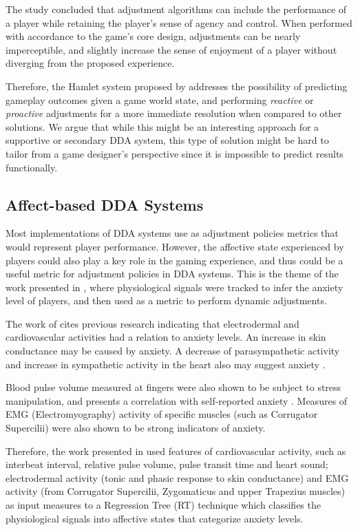 The study concluded that adjustment algorithms can include the performance of a player while retaining the player's sense of agency and control. When performed with accordance to the game's core design, adjustments can be nearly imperceptible, and slightly increase the sense of enjoyment of a player without diverging from the proposed experience.

Therefore, the Hamlet system proposed by \citet{article_casefordynamicdifficulty} addresses the possibility of predicting gameplay outcomes given a game world state, and performing \emph{reactive} or \emph{proactive} adjustments for a more immediate resolution when compared to other solutions. We argue that while this might be an interesting approach for a supportive or secondary DDA system, this type of solution might be hard to tailor from a game designer's perspective since it is impossible to predict results functionally.

\subsection{Affect-based DDA Systems}

Most implementations of DDA systems use as adjustment policies metrics that would represent player performance. However, the affective state experienced by players could also play a key role in the gaming experience, and thus could be a useful metric for adjustment policies in DDA systems. This is the theme of the work presented in \cite{article_affectivedda}, where physiological signals were tracked to infer the anxiety level of players, and then used as a metric to perform dynamic adjustments.

The work of \citet{article_affectivedda} cites previous research indicating that electrodermal and cardiovascular activities had a relation to anxiety levels. An increase in skin conductance may be caused by anxiety. A decrease of parasympathetic activity and increase in sympathetic activity in the heart also may suggest anxiety \cite{article_affectivedda}.

Blood pulse volume measured at fingers were also shown to be subject to stress manipulation, and presents a correlation with self-reported anxiety \cite{article_affectivedda}. Measures of EMG (Electromyography) activity of specific muscles (such as Corrugator Supercilii) were also shown to be strong indicators of anxiety.

Therefore, the work presented in \cite{article_affectivedda} used features of cardiovascular activity, such as interbeat interval, relative pulse volume, pulse transit time and heart sound; electrodermal activity (tonic and phasic response to skin conductance) and EMG activity (from Corrugator Supercilii, Zygomaticus and upper Trapezius muscles) as input measures to a Regression Tree (RT) technique which classifies the physiological signals into affective states that categorize anxiety levels.

